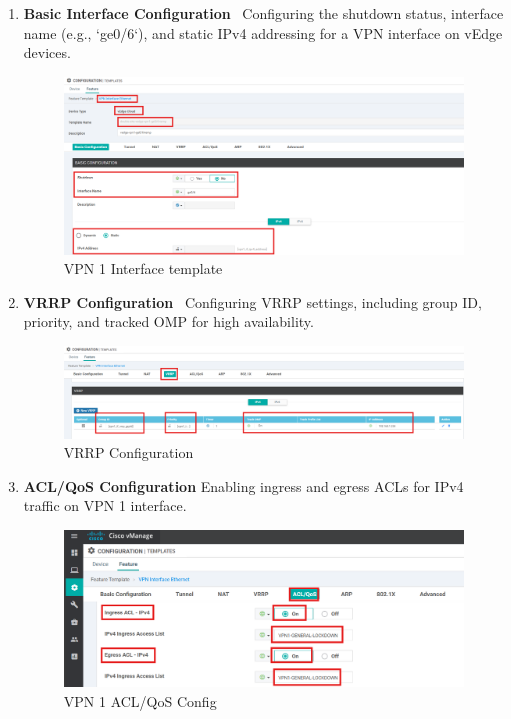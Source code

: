 \documentclass[12pt,english]{report}
\begin{document}
\begin{enumerate}
    \item \textbf{Basic Interface Configuration} \
    Configuring the shutdown status, interface name (e.g., `ge0/6`), and static IPv4 addressing for a VPN interface on vEdge devices.
\begin{figure}[H]
    \centering
    \includegraphics[width= 1 \textwidth]{chapitre 3/template/17.png}
    \caption{VPN 1 Interface template}
    \label{VPN 1 Interface template}
\end{figure}
    \item \textbf{VRRP Configuration} \
    Configuring VRRP settings, including group ID, priority, and tracked OMP for high availability.
\begin{figure}[H]
    \centering
    \includegraphics[width= 0.9 \textwidth]{chapitre 3/template/17.5.png}
    \caption{VRRP Configuration}
    \label{VRRP Configuration}
\end{figure}
    \item \textbf{ACL/QoS Configuration}
    Enabling ingress and egress ACLs for IPv4 traffic on VPN 1 interface.
\begin{figure}[H]
    \centering
    \includegraphics[width= 0.9 \textwidth]{chapitre 3/vpn1-acl-config.png}
    \caption{VPN 1 ACL/QoS Config}
    \label{VPN 1 ACL/QoS Config}
\end{figure}    
\end{enumerate}
\end{document}
